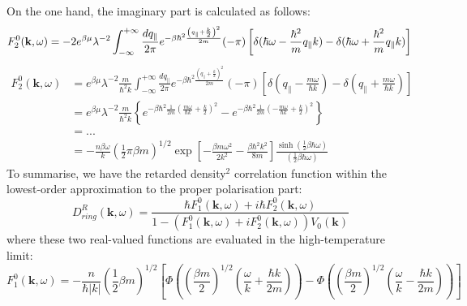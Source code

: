 On the one hand, the imaginary part is calculated as follows:
\begin{equation}
F^0_2(\mathbf k,\omega)=-2e^{\beta\mu}\lambda^{-2}\int_{-\infty}^{+\infty} \frac{d q_\parallel}{2\pi}e^{-\beta\hbar^2\frac{\left(q_\parallel+\frac{k}{2}\right)^2}{2m}} (-\pi)
\left[ \delta(\hbar \omega-\frac{\hbar^2}{m}q_\parallel k)-\delta(\hbar \omega+\frac{\hbar^2}{m}q_\parallel k) \right]\\
\end{equation}
\begin{equation}
\begin{aligned}
F^0_2(\mathbf k,\omega)&=e^{\beta\mu}\lambda^{-2}\frac{m}{\hbar^2 k} \int_{-\infty}^{+\infty} \frac{d q_\parallel}{2\pi}e^{-\beta\hbar^2\frac{\left(q_\parallel+\frac{k}{2}\right)^2}{2m}} (-\pi)
\left[ \delta(q_\parallel -\frac{m\omega}{\hbar k})-\delta(q_\parallel +\frac{m\omega}{\hbar k}) \right]\\
&=e^{\beta\mu}\lambda^{-2}\frac{m}{\hbar^2 k} \left\{ e^{-\beta\hbar^2 \frac{1}{2m}\left( \frac{m\omega}{\hbar k}+\frac{k}{2} \right)^2}-e^{-\beta\hbar^2 \frac{1}{2m}\left( -\frac{m\omega}{\hbar k}+\frac{k}{2} \right)^2} \right\}\\
&=...\\
&=-\frac{n\beta\omega}{k} \left( \frac{1}{2} \pi \beta m\right)^{1/2} \exp\left[ -\frac{\beta m\omega^2}{2k^2}-\frac{\beta\hbar^2 k^2}{8m} \right] \frac{\sinh \left( \frac{1}{2} \beta \hbar \omega \right)}{ \left( \frac{1}{2} \beta \hbar \omega \right)}
\end{aligned}
\end{equation}
To summarise, we have the retarded density$^2$ correlation function within the lowest-order approximation to the proper polarisation part:
\begin{equation}
D^R_{ring}(\mathbf k,\omega)=\frac{\hbar F^0_1(\mathbf k,\omega)+i\hbar F^0_2(\mathbf k,\omega)}{1-\left(F^0_1(\mathbf k,\omega)+iF^0_2(\mathbf k,\omega)\right)V_0(\mathbf k)}
\end{equation}
where these two real-valued functions are evaluated in the high-temperature limit:
\begin{equation}\label{eq4.9.40}
F^0_1(\mathbf k,\omega)=-\frac{n}{\hbar |k|}  \left( \frac{1}{2} \beta m \right)^{1/2} 
\left[ \Phi \left(\left(\frac{\beta m}{2}\right)^{1/2} \left( \frac{\omega}{k}+\frac{\hbar k}{2m} \right)\right)- \Phi \left(\left(\frac{\beta m}{2}\right)^{1/2} \left( \frac{\omega}{k}-\frac{\hbar k}{2m} \right)\right) \right]
\end{equation}
